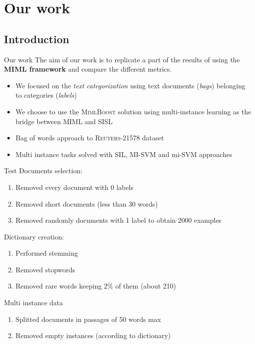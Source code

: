 \section{Our work}

\subsection*{Introduction}
\begin{frame}{Our work}
	The aim of our work is to replicate a part of the results of \cite{miml1} using the \textbf{MIML framework} and compare the different metrics.\\
	\vspace{12px}
	\begin{itemize}
		\item We focused on the \textit{text categorization} using text documents (\textit{bags}) belonging to categories (\textit{labels})
		\item We choose to use the \textsc{MimlBoost} solution using multi-instance learning as the bridge between MIML and SISL
		\item Bag of words approach to \textsc{Reuters-21578} dataset
		\item Multi instance tasks solved with SIL, MI-SVM and mi-SVM approaches
	\end{itemize}
\end{frame}

\begin{frame}{Test}
	Documents selection:
	\begin{enumerate}
		\item Removed every document with 0 labels
		\item Removed short documents (less than 30 words)
		\item Removed randomly documents with 1 label to obtain 2000 examples
	\end{enumerate}
	Dictionary creation:
	\begin{enumerate}
		\item Performed stemming
		\item Removed stopwords
		\item Removed rare words keeping $2\%$ of them (about 210)
	\end{enumerate}
	Multi instance data
	\begin{enumerate}
		\item Splitted documents in passages of 50 words max
		\item Removed empty instances (according to dictionary)
	\end{enumerate}
\end{frame}

